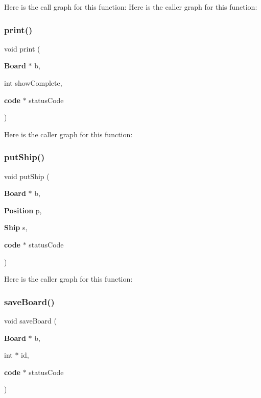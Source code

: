 Here is the call graph for this function\+:
Here is the caller graph for this function\+:
\label{funciones_8h_acf7fb2d72d56ba30e1956c8e05247ce7} 
\subsubsection{print()}
{\footnotesize\ttfamily void print (\begin{DoxyParamCaption}\item[{{\bf Board} $\ast$}]{b,  }\item[{int}]{show\+Complete,  }\item[{{\bf code} $\ast$}]{status\+Code }\end{DoxyParamCaption})}

Here is the caller graph for this function\+:
\label{funciones_8h_a601ceec2c364cd451fa0743194104a99} 
\subsubsection{put\+Ship()}
{\footnotesize\ttfamily void put\+Ship (\begin{DoxyParamCaption}\item[{{\bf Board} $\ast$}]{b,  }\item[{{\bf Position}}]{p,  }\item[{{\bf Ship}}]{s,  }\item[{{\bf code} $\ast$}]{status\+Code }\end{DoxyParamCaption})}

Here is the caller graph for this function\+:
\label{funciones_8h_a61cc12ef0ad979f7dbd81c62f0bfffd8} 
\subsubsection{save\+Board()}
{\footnotesize\ttfamily void save\+Board (\begin{DoxyParamCaption}\item[{{\bf Board} $\ast$}]{b,  }\item[{int $\ast$}]{id,  }\item[{{\bf code} $\ast$}]{status\+Code }\end{DoxyParamCaption})}

